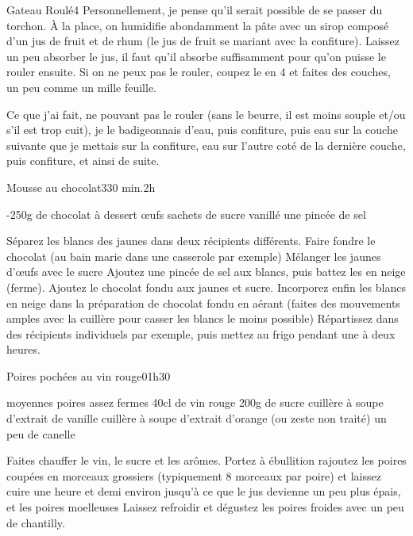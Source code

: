 \begin{recette}{Gateau Roulé}{4}{}{}
Personnellement, je pense qu'il serait possible de se passer du torchon. À la place, on humidifie abondamment la pâte avec un sirop composé d'un jus de fruit et de rhum (le jus de fruit se mariant avec la confiture). Laissez un peu absorber le jus, il faut qu'il absorbe suffisamment pour qu'on puisse le rouler ensuite. Si on ne peux pas le rouler, coupez le en 4 et faites des couches, un peu comme un mille feuille.

Ce que j'ai fait, ne pouvant pas le rouler (sans le beurre, il est moins souple et/ou s'il est trop cuit), je le badigeonnais d'eau, puis confiture, puis eau sur la couche suivante que je mettais sur la confiture, eau sur l'autre coté de la dernière couche, puis confiture, et ainsi de suite.

\end{recette}

\begin{recette}{Mousse au chocolat}{3}{30 min.}{2h}
\begin{ingredients}
-250g de chocolat à dessert
 œufs
 sachets de sucre vanillé
\ingredient une pincée de sel
\end{ingredients}

\begin{preparation}
\etape Séparez les blancs des jaunes dans deux récipients différents.
\etape Faire fondre le chocolat (au bain marie dans une casserole par exemple)
\etape Mélanger les jaunes d'œufs avec le sucre
\etape Ajoutez une pincée de sel aux blancs, puis battez les en neige (ferme).
\etape Ajoutez le chocolat fondu aux jaunes et sucre.
\etape Incorporez enfin les blancs en neige dans la préparation de chocolat fondu en aérant (faites des mouvements amples avec la cuillère pour casser les blancs le moins possible)
\etape Répartissez dans des récipients individuels par exemple, puis mettez au frigo pendant une à deux heures.
\end{preparation}
\end{recette}


\begin{recette}{Poires pochées au vin rouge}{0}{1h30}{}
\begin{ingredients}
 moyennes poires assez fermes
\ingredient 40cl de vin rouge
\ingredient 200g de sucre
 cuillère à soupe d'extrait de vanille
 cuillère à soupe d'extrait d'orange (ou zeste non traité)
\ingredient un peu de canelle
\end{ingredients}

\begin{preparation}
\etape Faites chauffer le vin, le sucre et les arômes. Portez à ébullition
\etape rajoutez les poires coupées en morceaux grossiers (typiquement 8 morceaux par poire) et laissez cuire une heure et demi environ jusqu'à ce que le jus devienne un peu plus épais, et les poires moelleuses
\etape Laissez refroidir et dégustez les poires froides avec un peu de chantilly.
\end{preparation}

\end{recette}

